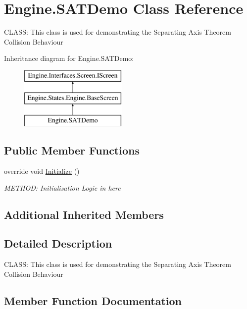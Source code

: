 \hypertarget{a00566}{}\section{Engine.\+S\+A\+T\+Demo Class Reference}
\label{a00566}


C\+L\+A\+SS\+: This class is used for demonstrating the Separating Axis Theorem Collision Behaviour  


Inheritance diagram for Engine.\+S\+A\+T\+Demo\+:\begin{figure}[H]
\begin{center}
\leavevmode
\includegraphics[height=3.000000cm]{d0/d3e/a00566}
\end{center}
\end{figure}
\subsection*{Public Member Functions}
\begin{DoxyCompactItemize}
\item 
override void \hyperlink{a00566_a051d8aea070a4c7a93f0cf494e4fac6a}{Initialize} ()
\begin{DoxyCompactList}\small\item\em M\+E\+T\+H\+OD\+: Initialisation Logic in here \end{DoxyCompactList}\end{DoxyCompactItemize}
\subsection*{Additional Inherited Members}


\subsection{Detailed Description}
C\+L\+A\+SS\+: This class is used for demonstrating the Separating Axis Theorem Collision Behaviour 



\subsection{Member Function Documentation}
\mbox{\label{a00566_a051d8aea070a4c7a93f0cf494e4fac6a}} 
